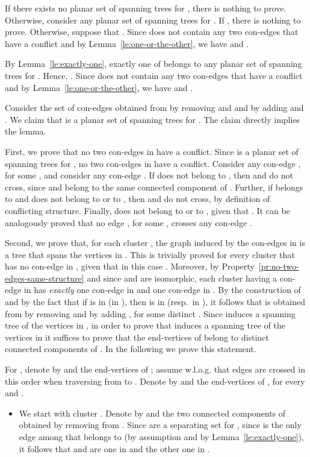 \documentclass[letter,runningheads]{llncs}
\renewenvironment{proof}
{{\em Proof.\ }}{\hspace*{\fill}\par\vspace{2mm}}
\begin{document}
\begin{proof}
If there exists no planar set of spanning trees for , there is nothing to prove. Otherwise, consider any planar set  of spanning trees for . If , there is nothing to prove. Otherwise, suppose that . Since  does not contain any two con-edges that have a conflict and by Lemma~\ref{le:one-or-the-other}, we have  and .

By Lemma~\ref{le:exactly-one}, exactly one of  belongs to any planar set  of spanning trees for . Hence, . Since  does not contain any two con-edges that have a conflict and by Lemma~\ref{le:one-or-the-other}, we have  and .

Consider the set  of con-edges obtained from  by removing  and  and by adding  and . We claim that  is a planar set of spanning trees for . The claim directly implies the lemma.

First, we prove that no two con-edges in  have a conflict. Since  is a planar set of spanning trees for , no two con-edges in  have a conflict. Consider any con-edge , for some , and consider any con-edge . If  does not belong to , then  and  do not cross, since  and  belong to the same connected component of . Further, if  belongs to  and does not belong to  or to , then  and  do not cross, by definition of conflicting structure. Finally,  does not belong to  or to , given that . It can be analogously proved that no edge , for some , crosses any con-edge .

Second, we prove that, for each cluster , the graph induced by the con-edges in  is a tree that spans the vertices in . This is trivially proved for every cluster  that has no con-edge in , given that in this case . Moreover, by Property~\ref{pr:no-two-edges-same-structure} and since  and  are isomorphic, each cluster  having a con-edge in  has {\em exactly} one con-edge  in  and one con-edge  in . By the construction of  and by the fact that if  is in  (in ), then  is in  (resp.\ in ), it follows that  is obtained from  by removing  and by adding , for some distinct . Since  induces a spanning tree of the vertices in , in order to prove that  induces a spanning tree of the vertices in  it suffices to prove that the end-vertices of  belong to distinct connected components of . In the following we prove this statement.

For , denote by  and  the end-vertices of ; assume w.l.o.g. that edges  are crossed in this order when traversing  from  to . Denote by  and  the end-vertices of , for every  and .

\begin{itemize}
\item We start with cluster . Denote by  and  the two connected components of  obtained by removing  from . Since  are a separating set for , since  is the only edge among  that belongs to  (by assumption and by Lemma~\ref{le:exactly-one}), it follows that  and  are one in  and the other one in .



\end{itemize}
\end{proof}
\end{document}
